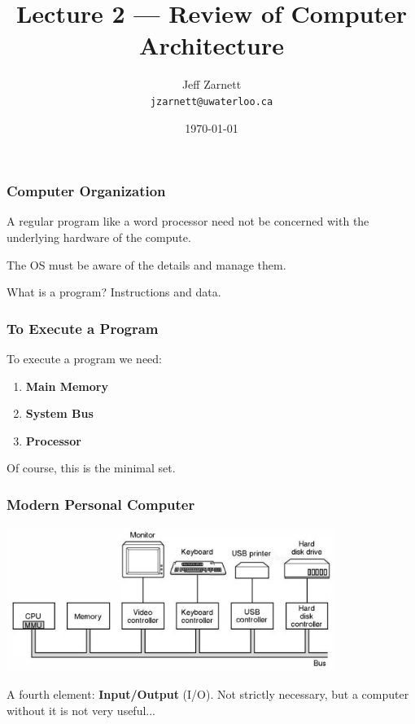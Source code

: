 

\title{Lecture 2 --- Review of Computer Architecture}

\author[Lam]{Jeff Zarnett \\ \small \texttt{jzarnett@uwaterloo.ca}}
\date{\today}




\begin{frame}
  \titlepage

 \end{frame}

\begin{frame}
\frametitle{Computer Organization}

A regular program like a word processor need not be concerned with the underlying hardware of the compute.

The OS must be aware of the details and manage them.

What is a program? Instructions and data.


\end{frame}

\begin{frame}
\frametitle{To Execute a Program}

To execute a program we need:

\begin{enumerate}
	\item \textbf{Main Memory}
	\item \textbf{System Bus}
	\item \textbf{Processor}
\end{enumerate}

Of course, this is the minimal set.

\end{frame}

\begin{frame}
\frametitle{Modern Personal Computer}

\begin{center}
\includegraphics[width=0.8\textwidth]{images/modernpc.png}
\end{center}

A fourth element: \textbf{Input/Output} (I/O). Not strictly necessary, but a computer without it is not very useful...
\end{frame}


